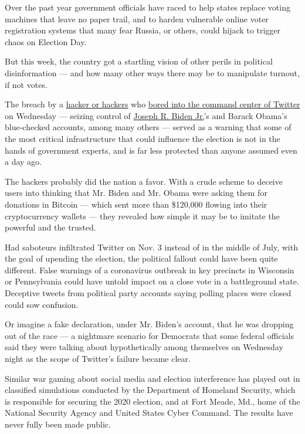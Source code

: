 Over the past year government officials have raced to help states
replace voting machines that leave no paper trail, and to harden
vulnerable online voter registration systems that many fear Russia, or
others, could hijack to trigger chaos on Election Day.

But this week, the country got a startling vision of other perils in
political disinformation --- and how many other ways there may be to
manipulate turnout, if not votes.

The breach by a
\href{https://www.nytimes.com/2020/07/17/technology/twitter-hackers-interview.html}{hacker
or hackers} who
\href{https://www.nytimes.com/2020/07/15/technology/twitter-hack-bill-gates-elon-musk.html}{bored
into the command center of Twitter} on Wednesday --- seizing control of
\href{https://www.nytimes.com/interactive/2020/us/elections/joe-biden.html}{Joseph
R. Biden Jr.}'s and Barack Obama's blue-checked accounts, among many
others --- served as a warning that some of the most critical
infrastructure that could influence the election is not in the hands of
government experts, and is far less protected than anyone assumed even a
day ago.

The hackers probably did the nation a favor. With a crude scheme to
deceive users into thinking that Mr. Biden and Mr. Obama were asking
them for donations in Bitcoin --- which sent more than \$120,000 flowing
into their cryptocurrency wallets --- they revealed how simple it may be
to imitate the powerful and the trusted.

Had saboteurs infiltrated Twitter on Nov. 3 instead of in the middle of
July, with the goal of upending the election, the political fallout
could have been quite different. False warnings of a coronavirus
outbreak in key precincts in Wisconsin or Pennsylvania could have untold
impact on a close vote in a battleground state. Deceptive tweets from
political party accounts saying polling places were closed could sow
confusion.

Or imagine a fake declaration, under Mr. Biden's account, that he was
dropping out of the race --- a nightmare scenario for Democrats that
some federal officials said they were talking about hypothetically among
themselves on Wednesday night as the scope of Twitter's failure became
clear.

Similar war gaming about social media and election interference has
played out in classified simulations conducted by the Department of
Homeland Security, which is responsible for securing the 2020 election,
and at Fort Meade, Md., home of the National Security Agency and United
States Cyber Command. The results have never fully been made public.

